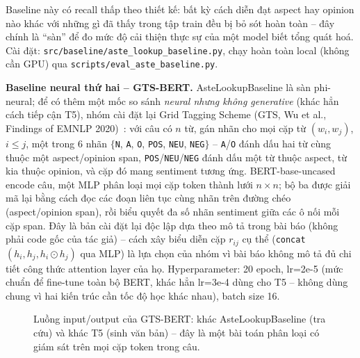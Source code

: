 \documentclass[11pt,a4paper]{article}
\begin{document}
Baseline này có recall thấp theo thiết kế: bất kỳ cách diễn đạt aspect hay
opinion nào khác với những gì đã thấy trong tập train đều bị bỏ sót hoàn
toàn -- đây chính là ``sàn'' để đo mức độ cải thiện thực sự của một model
biết tổng quát hoá. Cài đặt: \texttt{src/\allowbreak baseline/\allowbreak aste\_\allowbreak lookup\_\allowbreak baseline.py},
chạy hoàn toàn local (không cần GPU) qua \texttt{scripts/\allowbreak eval\_\allowbreak aste\_\allowbreak baseline.py}.

\textbf{Baseline neural thứ hai -- GTS-BERT.} AsteLookupBaseline là sàn
phi-neural; để có thêm một mốc so sánh \emph{neural nhưng không
generative} (khác hẳn cách tiếp cận T5), nhóm cài đặt lại Grid Tagging
Scheme (GTS, Wu et al., Findings of EMNLP 2020)~\cite{gts}: với câu có $n$
từ, gán nhãn cho mọi cặp từ $(w_i, w_j)$, $i \leq j$, một trong 6 nhãn
$\{$\texttt{N}, \texttt{A}, \texttt{O}, \texttt{POS}, \texttt{NEU},
\texttt{NEG}$\}$ -- \texttt{A}/\texttt{O} đánh dấu hai từ cùng thuộc một
aspect/opinion span, \texttt{POS}/\texttt{NEU}/\texttt{NEG} đánh dấu một
từ thuộc aspect, từ kia thuộc opinion, và cặp đó mang sentiment tương
ứng. BERT-base-uncased encode câu, một MLP phân loại mọi cặp token thành
lưới $n \times n$; bộ ba được giải mã lại bằng cách đọc các đoạn liên tục
cùng nhãn trên đường chéo (aspect/opinion span), rồi biểu quyết đa số nhãn
sentiment giữa các ô nối mỗi cặp span. Đây là bản cài đặt lại độc lập dựa
theo mô tả trong bài báo (không phải code gốc của tác giả) -- cách xây
biểu diễn cặp $r_{ij}$ cụ thể (\texttt{concat}$(h_i, h_j, h_i \odot h_j)$
qua MLP) là lựa chọn của nhóm vì bài báo không mô tả đủ chi tiết công thức
attention layer của họ. Hyperparameter: 20 epoch, lr=2e-5 (mức chuẩn để
fine-tune toàn bộ BERT, khác hẳn lr=3e-4 dùng cho T5 -- không dùng chung
vì hai kiến trúc cần tốc độ học khác nhau), batch size 16.

\begin{figure}[h]
\centering
{}
\caption{Luồng input/output của GTS-BERT: khác AsteLookupBaseline (tra
cứu) và khác T5 (sinh văn bản) -- đây là một bài toán phân loại có giám
sát trên mọi cặp token trong câu.}
\end{figure}
\end{document}
